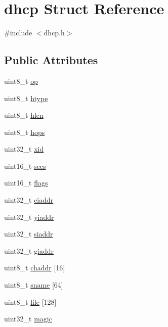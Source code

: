 \hypertarget{structdhcp}{}\section{dhcp Struct Reference}
\label{structdhcp}


{\ttfamily \#include $<$dhcp.\+h$>$}

\subsection*{Public Attributes}
\begin{DoxyCompactItemize}
\item 
uint8\+\_\+t \hyperlink{structdhcp_a1d880613cc979103ed98f49ab84ccf8f}{op}
\item 
uint8\+\_\+t \hyperlink{structdhcp_a25aa305e3a755c8d5e0e1dbf2f4712f0}{htype}
\item 
uint8\+\_\+t \hyperlink{structdhcp_a9ff8f4981a4ef8c4a85e040208170066}{hlen}
\item 
uint8\+\_\+t \hyperlink{structdhcp_ade25ac060b0d4cba12870a75b2443a4c}{hops}
\item 
uint32\+\_\+t \hyperlink{structdhcp_ae746102c3b1356e9fbf48b6b9eef51da}{xid}
\item 
uint16\+\_\+t \hyperlink{structdhcp_a9876a1e7b7443353eaf5f1508d302a85}{secs}
\item 
uint16\+\_\+t \hyperlink{structdhcp_a21295bba2bb173c2da0a1b50a7215564}{flags}
\item 
uint32\+\_\+t \hyperlink{structdhcp_a2f28f3c28fbb73c4ea35fa1b4db39a71}{ciaddr}
\item 
uint32\+\_\+t \hyperlink{structdhcp_a1d7df83a89311561fa6de62d0b67dd1e}{yiaddr}
\item 
uint32\+\_\+t \hyperlink{structdhcp_a7b507d97b618f2f95f20240277ec5247}{siaddr}
\item 
uint32\+\_\+t \hyperlink{structdhcp_a175defe50d079e97db3adc33b7df0860}{giaddr}
\item 
uint8\+\_\+t \hyperlink{structdhcp_a1e7bd991590e27ed159eb35fa5ae16a1}{chaddr} \mbox{[}16\mbox{]}
\item 
uint8\+\_\+t \hyperlink{structdhcp_a73489c8becbd6b9fbc3a6dc5d32014af}{sname} \mbox{[}64\mbox{]}
\item 
uint8\+\_\+t \hyperlink{structdhcp_a3781bedf796fcc9bb89dd7bbbbe65a81}{file} \mbox{[}128\mbox{]}
\item 
uint32\+\_\+t \hyperlink{structdhcp_a62a16851b06459a16d1070b38245a51a}{magic}
\end{DoxyCompactItemize}


